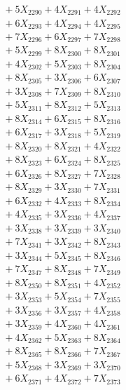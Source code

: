 \documentclass[a4paper,10pt]{article}
\begin{document}
{\begin{align}
&\;  + 5 X_{2290} + 4 X_{2291} + 4 X_{2292} \\[0.3ex]
&\;  + 6 X_{2293} + 4 X_{2294} + 4 X_{2295} \\[0.3ex]
&\;  + 7 X_{2296} + 6 X_{2297} + 7 X_{2298} \\[0.3ex]
&\;  + 5 X_{2299} + 8 X_{2300} + 8 X_{2301} \\[0.3ex]
&\;  + 4 X_{2302} + 5 X_{2303} + 8 X_{2304} \\[0.3ex]
&\;  + 8 X_{2305} + 3 X_{2306} + 6 X_{2307} \\[0.3ex]
&\;  + 3 X_{2308} + 7 X_{2309} + 8 X_{2310} \\[0.3ex]
&\;  + 5 X_{2311} + 8 X_{2312} + 5 X_{2313} \\[0.3ex]
&\;  + 8 X_{2314} + 6 X_{2315} + 8 X_{2316} \\[0.3ex]
&\;  + 6 X_{2317} + 3 X_{2318} + 5 X_{2319} \\[0.5ex]\allowbreak
&\;  + 8 X_{2320} + 8 X_{2321} + 4 X_{2322} \\[0.3ex]
&\;  + 8 X_{2323} + 6 X_{2324} + 8 X_{2325} \\[0.3ex]
&\;  + 6 X_{2326} + 8 X_{2327} + 7 X_{2328} \\[0.3ex]
&\;  + 8 X_{2329} + 3 X_{2330} + 7 X_{2331} \\[0.3ex]
&\;  + 6 X_{2332} + 4 X_{2333} + 8 X_{2334} \\[0.3ex]
&\;  + 4 X_{2335} + 3 X_{2336} + 4 X_{2337} \\[0.3ex]
&\;  + 3 X_{2338} + 3 X_{2339} + 3 X_{2340} \\[0.3ex]
&\;  + 7 X_{2341} + 3 X_{2342} + 8 X_{2343} \\[0.3ex]
&\;  + 3 X_{2344} + 5 X_{2345} + 8 X_{2346} \\[0.3ex]
&\;  + 7 X_{2347} + 8 X_{2348} + 7 X_{2349} \\[0.5ex]\allowbreak
&\;  + 8 X_{2350} + 8 X_{2351} + 4 X_{2352} \\[0.3ex]
&\;  + 3 X_{2353} + 5 X_{2354} + 7 X_{2355} \\[0.3ex]
&\;  + 3 X_{2356} + 3 X_{2357} + 4 X_{2358} \\[0.3ex]
&\;  + 3 X_{2359} + 4 X_{2360} + 4 X_{2361} \\[0.3ex]
&\;  + 4 X_{2362} + 5 X_{2363} + 8 X_{2364} \\[0.3ex]
&\;  + 8 X_{2365} + 8 X_{2366} + 7 X_{2367} \\[0.3ex]
&\;  + 5 X_{2368} + 3 X_{2369} + 3 X_{2370} \\[0.3ex]
&\;  + 6 X_{2371} + 4 X_{2372} + 7 X_{2373} \\[0.3ex]

\end{align}}
\end{document}
